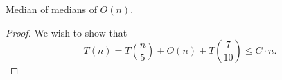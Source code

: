 
\begin{theorem}
	Median of medians of \( O(n) \).
\end{theorem}
\begin{proof}
	We wish to show that \[
		T(n) = T\left(\frac{n}{5}\right) + O(n) + T\left(\frac{7}{10}\right) \le C \cdot n
	.\] 
\end{proof}
